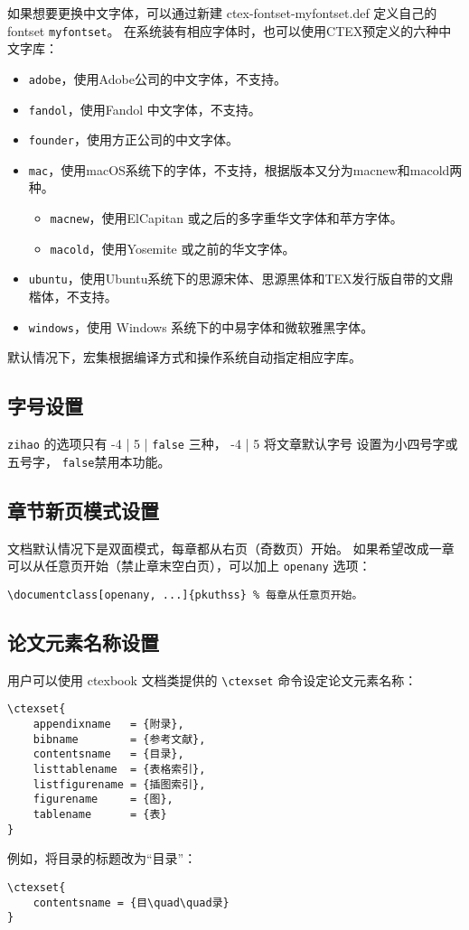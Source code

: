 如果想要更换中文字体，可以通过新建 ctex-fontset-myfontset.def 定义自己的 fontset \verb|myfontset|。
在系统装有相应字体时，也可以使用CTEX预定义的六种中文字库：
\begin{itemize}
    \item \verb|adobe|，使用Adobe公司的中文字体，不支持。
    \item \verb|fandol|，使用Fandol 中文字体，不支持。
    \item \verb|founder|，使用方正公司的中文字体。
    \item \verb|mac|，使用macOS系统下的字体，不支持，根据版本又分为macnew和macold两种。
    \begin{itemize}
        \item \verb|macnew|，使用ElCapitan 或之后的多字重华文字体和苹方字体。
        \item \verb|macold|，使用Yosemite 或之前的华文字体。
    \end{itemize}
    \item \verb|ubuntu|，使用Ubuntu系统下的思源宋体、思源黑体和TEX发行版自带的文鼎楷体，不支持。
    \item \verb|windows|，使用 Windows 系统下的中易字体和微软雅黑字体。
\end{itemize}
默认情况下，\CTeX{}宏集根据编译方式和操作系统自动指定相应字库。

\subsection{字号设置}

\texttt{zihao} 的选项只有 -4 | 5 | \texttt{false} 三种，
-4 | 5 将文章默认字号 \texttt{\bfseries\string\normalsize}设置为小四号字或五号字，
\texttt{false}禁用本功能。

\subsection{章节新页模式设置}
文档默认情况下是双面模式，每章都从右页（奇数页）开始。
如果希望改成一章可以从任意页开始（禁止章末空白页），可以加上 \texttt{openany} 选项：
\begin{Verbatim}
\documentclass[openany, ...]{pkuthss} % 每章从任意页开始。
\end{Verbatim}

\subsection{论文元素名称设置}
用户可以使用 ctexbook 文档类提供的 \verb|\ctexset| 命令设定论文元素名称：
\begin{Verbatim}
\ctexset{
    appendixname   = {附录},
    bibname        = {参考文献},
    contentsname   = {目录},
    listtablename  = {表格索引},
    listfigurename = {插图索引},
    figurename     = {图},
    tablename      = {表}
}
\end{Verbatim}
例如，将目录的标题改为“目{\quad\quad}录”：
\begin{Verbatim}
\ctexset{
    contentsname = {目\quad\quad录}
}
\end{Verbatim}

